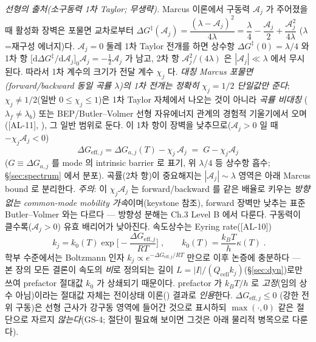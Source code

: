 \documentclass[11pt,a4paper]{article}
\newcommand{\dd}{\mathrm{d}}
\newcommand{\eff}{\mathrm{eff}}
\newcommand{\cell}{\mathrm{cell}}
\newcommand{\AL}[1]{\textsf{[AL-#1]}}
\begin{document}
\emph{선형의 출처(소구동력 1차 Taylor; 무생략).} Marcus 이론에서 구동력 $\mathcal A_j$ 가 주어졌을 때
활성화 장벽은 포물면 교차로부터 $\Delta G^\ddagger(\mathcal A_j)=\dfrac{(\lambda-\mathcal A_j)^2}{4\lambda}
=\dfrac{\lambda}{4}-\dfrac{\mathcal A_j}{2}+\dfrac{\mathcal A_j^2}{4\lambda}$ ($\lambda$=재구성 에너지)다.
$\mathcal A_j=0$ 둘레 1차 Taylor 전개를 하면 상수항 $\Delta G^\ddagger(0)=\lambda/4$ 와 1차 항
$\big[\dd\Delta G^\ddagger/\dd\mathcal A_j\big]_{0}\mathcal A_j=-\tfrac12\mathcal A_j$ 가 남고, 2차 항
$\mathcal A_j^2/(4\lambda)$ 은 $|\mathcal A_j|\ll\lambda$ 에서 무시된다. 따라서 1차 계수의 크기가 전달 계수
$\chi_j$ 다. \emph{대칭 Marcus 포물면(forward/backward 동일 곡률 $\lambda$)의 1차 전개는 정확히 $\chi_j=1/2$
단일값만 준다}; $\chi_j\ne1/2$(일반 $0\le\chi_j\le1$)은 1차 Taylor 자체에서 나오는 것이 아니라 \emph{곡률 비대칭}
($\lambda_f\ne\lambda_b$) 또는 BEP/Butler--Volmer 선형 자유에너지 관계의 경험적 기울기에서 오며
(\AL{11}, \cite{evanspolanyi1938,bardfaulkner}), 그 일반 범위로 둔다. 이 1차 항이 장벽을 낮추므로($\mathcal A_j>0$ 일 때 $-\chi_j\mathcal A_j<0$)
\begin{equation}
\boxed{\;\Delta G_{\eff,j}=\Delta G_{a,j}(T)-\chi_j\,\mathcal A_j\;=\;G-\chi_j\mathcal A_j\;}
\label{eq:Geff}
\end{equation}
($G\equiv\Delta G_{a,j}$ 를 mode 의 intrinsic barrier 로 표기, 위 $\lambda/4$ 등 상수항 흡수;
\S\ref{sec:spectrum} 에서 분포). 곡률(2차 항)이 중요해지는 $|\mathcal A_j|\sim\lambda$ 영역은 아래 Marcus
bound 로 분리한다. \emph{주의}: 이 $\chi_j\mathcal A_j$ 는 forward/backward 를 같은 배율로 키우는
\emph{방향 없는 common-mode mobility 가속}이며(keystone 참조), forward 장벽만 낮추는 표준 Butler--Volmer
와는 다르다 — 방향성 분해는 Ch.3 Level B 에서 다룬다. 구동력이
클수록($\mathcal A_j>0$) 유효 배리어가 낮아진다. 속도상수는 Eyring rate(\AL{10})
\begin{equation}
\boxed{\;k_j=k_0(T)\exp\!\Big[-\frac{\Delta G_{\eff,j}}{RT}\Big]\;,\qquad k_0(T)=\frac{k_BT}{h}\kappa(T)\;.}
\label{eq:kact}
\end{equation}
학부 수준에서는 Boltzmann 인자 $k_j\propto e^{-\Delta G_{\eff,j}/RT}$ 만으로 이후 논증에 충분하다 — 본 장의
모든 결론이 속도의 \emph{비}로 정의되는 길이 $L=|I|/(Q_\cell k_j)$(\S\ref{sec:dyn})로만 쓰여 prefactor 절대값
$k_0$ 가 상쇄되기 때문이다. prefactor 가 $k_BT/h$ 로 \emph{고정}(임의 상수 아님)이라는 절대값 자체는 전이상태
이론(\cite{eyring1935}) 결과로 \emph{인용}한다. $\Delta G_{\eff,j}\le0$
(강한 전위 구동)은 선형 근사가 강구동 영역에 들어간 것으로 표시하되 $\max(\cdot,0)$ 같은 절단으로 자르지
\emph{않는다}(GS-4; 절단이 필요해 보이면 그것은 아래 물리적 병목으로 다룬다).
\end{document}
